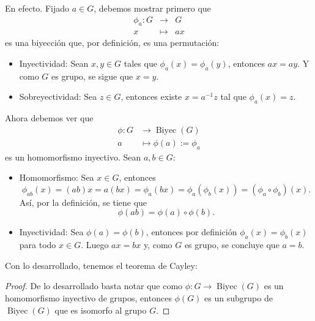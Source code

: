 \noindent En efecto. Fijado $a \in G$, debemos mostrar primero que
\[
\begin{array}{rcl}
	\phi_a: G &\to& G \\
	x &\mapsto& ax
\end{array}
\]
es una biyección que, por definición, es una permutación:
\begin{itemize}
	\item Inyectividad: Sean $x, y \in G$ tales que $\phi_a(x) = \phi_a(y)$, entonces $ax = ay$. Y como $G$ es grupo, se sigue que $x = y$.
	
	\item Sobreyectividad: Sea $z \in G$, entonces existe $x = a^{-1}z$ tal que $\phi_a(x) = z$.
\end{itemize}

\noindent Ahora debemos ver que  
\begin{align*}
	\phi: G &\longrightarrow \operatorname{Biyec}(G) \\
	a &\longmapsto \phi(a) := \phi_a
\end{align*}
es un homomorfismo inyectivo. Sean $a, b \in G$:
\begin{itemize}
	\item Homomorfismo: Sea $x \in G$, entonces
	\[
	\phi_{ab}(x) = (ab)x = a(bx) = \phi_a(bx) = \phi_a(\phi_b(x)) = (\phi_a \circ \phi_b)(x).
	\]
	Así, por la definición, se tiene que
	\[
	\phi(ab) = \phi(a) \circ \phi(b).
	\]
	
	\item Inyectividad: Sea $\phi(a) = \phi(b)$, entonces por definición $\phi_a(x) = \phi_b(x)$ para todo $x \in G$. Luego $ax = bx$ y, como $G$ es grupo, se concluye que $a = b$.
\end{itemize}

\noindent Con lo desarrollado, tenemos el teorema de Cayley:

\begin{teorema}
\end{teorema}

\begin{proof}
	De lo desarrollado basta notar que como $\phi: G \to \operatorname{Biyec}(G)$ es un homomorfismo inyectivo de grupos, entonces $\phi(G)$ es un subgrupo de $\operatorname{Biyec}(G)$ que es isomorfo al grupo $G$.
\end{proof}






